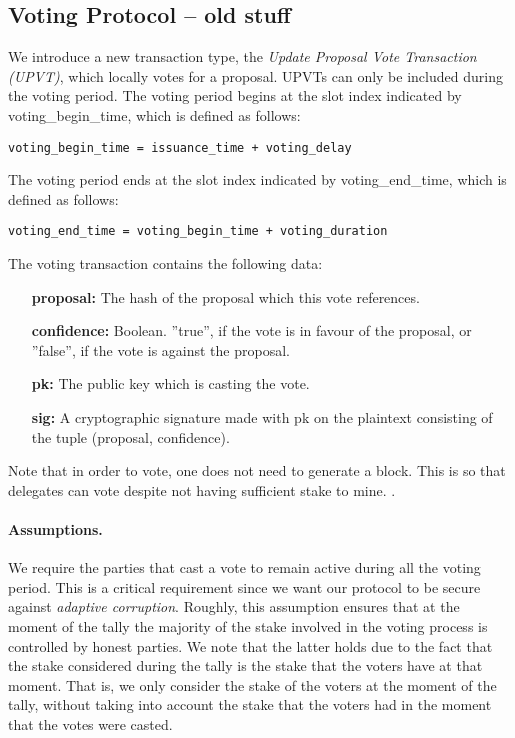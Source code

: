 \subsection*{Voting Protocol -- old stuff}
We introduce a new transaction type, the \emph{Update Proposal Vote Transaction (UPVT)}, which locally votes for a proposal. UPVTs can only be included during the voting period. 
The voting period begins at the slot index indicated by voting\_begin\_time, which is defined as follows:

\begin{verbatim}
voting_begin_time = issuance_time + voting_delay
\end{verbatim}

The voting period ends at the slot index indicated by voting\_end\_time, which is defined as follows:

\begin{verbatim}
voting_end_time = voting_begin_time + voting_duration
\end{verbatim}

The voting transaction contains the following data:
\begin{itemize}
\item[\textbf{proposal:}] The hash of the proposal which this vote references.
\item[\textbf{confidence:}] Boolean. ''true'', if the vote is in favour of the proposal, or ''false'', if the vote is against the proposal.
\item[\textbf{pk:}] The public key which is casting the vote.
\item[\textbf{sig:}] A cryptographic signature made with pk on the plaintext consisting of the tuple (proposal, confidence).
\end{itemize}

Note that in order to vote, one does not need to generate a block. This is so that delegates can vote despite not having sufficient stake to mine.
.
\paragraph{Assumptions.} We require the parties that cast a vote to remain active during all the voting
period. This is a critical requirement since we want our protocol to be secure against \emph{adaptive corruption}. Roughly, this assumption ensures that at the moment of the tally the majority
of the stake involved in the voting process is controlled by honest parties.
We note that the latter holds due to the fact that the stake considered during the tally is the stake 
that the voters have at that moment. That is, we only consider the stake of the voters at the moment of
the tally, without taking into account the stake that the voters had in the moment that the votes were casted.  


